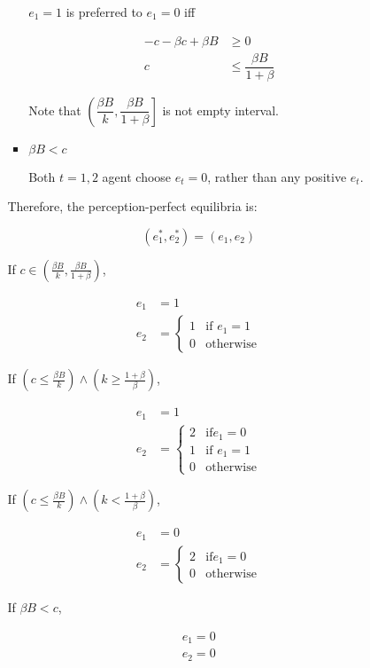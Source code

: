 \documentclass{jsarticle}
\begin{document}
\begin{enumerate}
\begin{enumerate}
\begin{itemize}
\begin{itemize}
$e_1=1$ is preferred to $e_1=0$ iff

\begin{align*}
-c - \beta c + \beta B &\geq 0 \\
c & \leq \dfrac{\beta B}{1+\beta}
\end{align*}

Note that $\left( \dfrac{\beta B}{k}, \dfrac{\beta B}{1+\beta} \right]$ is not empty interval.

\item $\beta B < c$

Both $t=1,2$ agent choose $e_t=0$, rather than any positive $e_t$.

\end{itemize}

\newpage

Therefore, the perception-perfect equilibria is:

\[(e_1^*, e_2^*)=(e_1,e_2) \]

If $c \in (\frac{\beta B}{k}, \frac{\beta B}{1+\beta})$,

\begin{align*}
e_1 &=1 \\
e_2 &=\begin{cases}
1 & \text{if } e_1=1 \\
0 & \text{otherwise}
\end{cases}
\end{align*}

If $(c \leq \frac{\beta B}{k}) \wedge (k \geq \frac{1+\beta}{\beta})$,

\begin{align*}
e_1 &=1 \\
e_2 &=\begin{cases}
2 & \text{if} e_1=0 \\
1 & \text{if } e_1=1 \\
0 & \text{otherwise}
\end{cases}
\end{align*}

If $(c \leq \frac{\beta B}{k}) \wedge (k < \frac{1+\beta}{\beta})$, 

\begin{align*}
e_1 &=0 \\
e_2 &=\begin{cases}
2 & \text{if} e_1=0 \\
0 & \text{otherwise}
\end{cases}
\end{align*}

If $\beta B < c$,

\begin{align*}
e_1=0 \\
e_2=0
\end{align*}

\end{itemize}

\end{enumerate}

\end{enumerate}
\end{document}
